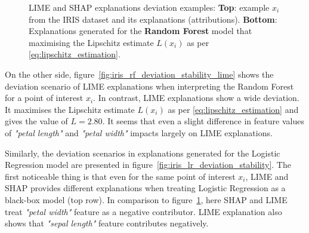 \documentclass[english]{tktltiki2}
\theoremstyle{definition}
\theoremstyle{remark}
\begin{document}
\begin{figure}[H]
	\hspace*{\fill}%
	\caption{LIME and SHAP explanations deviation examples: \textbf{Top}: example $x_i$ from the IRIS dataset and its explanations (attributions). \textbf{Bottom}: Explanations generated for the \textbf{Random Forest} model that maximising the Lipschitz estimate $L(x_i)$ as per \eqref{eq:lipschitz_estimation}.}%
	\label{fig:iris_rf_deviation_stability}%
\end{figure}

On the other side, figure~\ref{fig:iris_rf_deviation_stability_lime} shows the deviation scenario of LIME explanations when interpreting the Random Forest for a point of interest $x_i$. In contrast, LIME explanations show a wide deviation. It maximises the Lipschitz estimate $L(x_i)$ as per \eqref{eq:lipschitz_estimation} and gives the value of $L=2.80$. It seems that even a slight difference in feature values of \textit{"petal length"} and \textit{"petal width"} impacts largely on LIME explanations.


Similarly, the deviation scenarios in explanations generated for the Logistic Regression model are presented in figure~\ref{fig:iris_lr_deviation_stability}. The first noticeable thing is that even for the same point of interest $x_i$, LIME and SHAP provides different explanations when treating Logistic Regression as a black-box model (top row). In comparison to figure~\ref{fig:iris_rf_deviation_stability}, here SHAP and LIME treat \textit{"petal width"} feature as a negative contributor. LIME explanation also shows that \textit{"sepal length"} feature contributes negatively.
\end{document}
